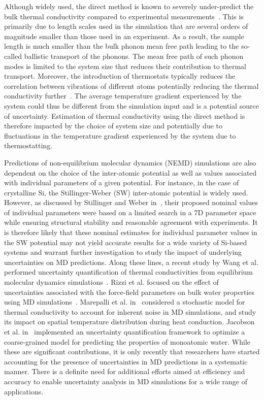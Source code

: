 Although widely used, the direct method is known to severely under-predict
the bulk thermal conductivity compared to experimental 
measurements~\cite{Haynes:2014,Shanks:1963}. This is primarily
due to length scales used in the simulation that are several orders of magnitude smaller
than those used in an experiment. As a result, the sample length is much smaller than the
bulk phonon mean free path leading to the so-called ballistic transport of the phonons.
The mean free path of such phonon modes is limited to the system size that reduces their
contribution to thermal transport. Moreover, the
introduction of thermostats typically reduces the correlation between vibrations of 
different atoms potentially reducing the thermal conductivity
further~\cite{Evans:2008}. The average temperature gradient experienced by the 
system could thus be different from the simulation input and is a potential source of 
uncertainty. Estimation of thermal conductivity using the
direct method is therefore impacted by the choice of system size and potentially due to
fluctuations in the temperature gradient experienced by the system due to thermostatting.  

Predictions of non-equilibrium molecular dynamics (NEMD) simulations are also dependent on the
choice of the inter-atomic potential as well as values associated with individual parameters
of a given potential. For instance, in the case of crystalline Si, the Stillinger-Weber (SW)
inter-atomic potential is widely used. However, as discussed by Stillinger and Weber
in~\cite{Stillinger:1985}, their proposed nominal values of individual parameters were based
on a limited search in a 7D parameter space while ensuring structural stability and
reasonable agreement with experiments. It is therefore likely that these nominal estimates
for individual parameter values in the SW potential may not yield accurate results for a
wide variety of Si-based systems and warrant further investigation to study the impact of
underlying uncertainties on MD predictions. Along these lines, 
a recent study by Wang et al. performed uncertainty quantification of thermal conductivities
from equilibrium molecular dynamics simulations~\cite{Wang:2017}.
Rizzi et al. focused on the effect of
uncertainties associated with the force-field parameters on bulk water properties using MD
simulations~\cite{Rizzi:2012}. Marepalli et al. in~\cite{Marepalli:2014} considered a stochastic model
for thermal conductivity to account for inherent noise in MD simulations, and study its impact on
spatial temperature 
distribution during heat conduction. Jacobson et al. in~\cite{Jacobson:2014} implemented an uncertainty
quantification framework to optimize a coarse-grained model for predicting the properties of monoatomic
 water. While these are significant contributions, it is only recently 
that researchers have started accounting for the presence of uncertainties in MD predictions in a
systematic manner. There is a definite need for additional efforts aimed at efficiency and accuracy
to enable uncertainty analysis in MD simulations for a wide range of applications.

